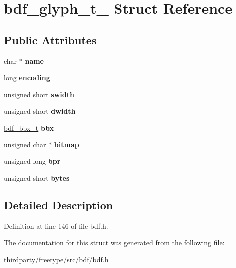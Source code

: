 \hypertarget{structbdf__glyph__t__}{}\section{bdf\+\_\+glyph\+\_\+t\+\_\+ Struct Reference}
\label{structbdf__glyph__t__}
\subsection*{Public Attributes}
\begin{DoxyCompactItemize}
\item 
\mbox{\label{structbdf__glyph__t___adcb5cc21da654f907c5ae5848159886c}} 
char $\ast$ {\bfseries name}
\item 
\mbox{\label{structbdf__glyph__t___a18b839b7b552ea0073e81e0e0c03f06a}} 
long {\bfseries encoding}
\item 
\mbox{\label{structbdf__glyph__t___a4df8445c7bd9d289e396bc7feaabade8}} 
unsigned short {\bfseries swidth}
\item 
\mbox{\label{structbdf__glyph__t___a4a514c0d62e761aa1c00ef24d7c1036c}} 
unsigned short {\bfseries dwidth}
\item 
\mbox{\label{structbdf__glyph__t___a4ffd35898d76ffa81bd776d4f66307f5}} 
\hyperlink{structbdf__bbx__t__}{bdf\+\_\+bbx\+\_\+t} {\bfseries bbx}
\item 
\mbox{\label{structbdf__glyph__t___a225f6f82a06b20666c49dd746c55d9fd}} 
unsigned char $\ast$ {\bfseries bitmap}
\item 
\mbox{\label{structbdf__glyph__t___ac1d372ce97949b585ad23fab6c1c4484}} 
unsigned long {\bfseries bpr}
\item 
\mbox{\label{structbdf__glyph__t___a67e54788cd17e66d237ee11685f12be4}} 
unsigned short {\bfseries bytes}
\end{DoxyCompactItemize}


\subsection{Detailed Description}


Definition at line 146 of file bdf.\+h.



The documentation for this struct was generated from the following file\+:\begin{DoxyCompactItemize}
\item 
thirdparty/freetype/src/bdf/bdf.\+h\end{DoxyCompactItemize}

